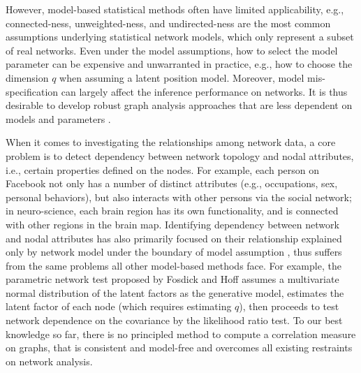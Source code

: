 \documentclass[11pt]{article}
\theoremstyle{definition}
\begin{document}
However, model-based statistical methods often have limited applicability, e.g., connected-ness, unweighted-ness, and undirected-ness are the most common assumptions underlying statistical network models, which only represent a subset of real networks. Even under the model assumptions, how to select the model parameter can be expensive and unwarranted in practice, e.g., how to choose the dimension $q$ when assuming a latent position model. Moreover, model mis-specification can largely affect the inference performance on networks. It is thus desirable to develop robust graph analysis approaches that are less dependent on models and parameters \cite{ChenShenVogelsteinPriebe2016}.

When it comes to investigating the relationships among network data, a core problem is to detect dependency between network topology and nodal attributes, i.e., certain properties defined on the nodes. For example, each person on Facebook not only has a number of distinct attributes (e.g., occupations, sex, personal behaviors), but also interacts with other persons via the social network; in neuro-science, each brain region has its own functionality, and is connected with other regions in the brain map. Identifying dependency between network and nodal attributes has also primarily focused on their relationship explained only by network model under the boundary of model assumption \cite{wasserman1996logit, fosdick2015testing, howard2016understanding}, thus suffers from the same problems all other model-based methods face. For example, the parametric network test proposed by Fosdick and Hoff \cite{fosdick2015testing} assumes a multivariate normal distribution of the latent factors as the generative model, estimates the latent factor of each node (which requires estimating $q$), then proceeds to test network dependence on the covariance by the likelihood ratio test. To our best knowledge so far, there is no principled method to compute a correlation measure on graphs, that is consistent and model-free and overcomes all existing restraints on network analysis. 
\end{document}
